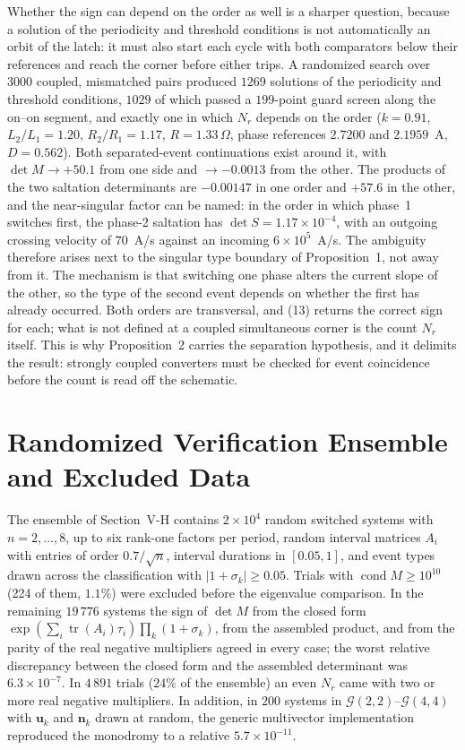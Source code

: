 \documentclass[journal]{IEEEtran}
\begin{document}
Whether the sign can depend on the order as well is a sharper question,
because a solution of the periodicity and threshold conditions is not
automatically an orbit of the latch: it must also start each cycle with both
comparators below their references and reach the corner before either
trips. A randomized search over $3000$ coupled, mismatched pairs produced
$1269$ solutions of the periodicity and threshold conditions, $1029$ of
which passed a $199$-point guard screen along the on--on segment, and
exactly one in which $N_r$ depends on the order ($k=0.91$, $L_2/L_1=1.20$,
$R_2/R_1=1.17$, $R=1.33\,\Omega$, phase references $2.7200$ and $2.1959$~A,
$D=0.562$). Both separated-event continuations exist around it, with
$\det M\to+50.1$ from one side and $\to-0.0013$ from the other. The products
of the two saltation determinants are $-0.00147$ in one order and $+57.6$
in the other, and the near-singular factor can be named: in the order in
which phase~1 switches first, the phase-2 saltation has
$\det S=1.17\times10^{-4}$, with an outgoing crossing velocity of $70$~A/s
against an incoming $6\times10^{5}$~A/s. The ambiguity therefore arises next
to the singular type boundary of Proposition~1, not away
from it. The mechanism is that switching one phase alters the current slope
of the other, so the type of the second event depends on whether the
first has already occurred. Both orders are transversal, and
(13) returns the correct sign for each; what is not defined at
a coupled simultaneous corner is the count $N_r$ itself. This is why
Proposition~2 carries the separation hypothesis, and it
delimits the result: strongly coupled converters must be checked for event
coincidence before the count is read off the schematic.

\section{Randomized Verification Ensemble and Excluded Data}
The ensemble of Section~V-H contains $2\times10^{4}$ random
switched systems with $n=2,\dots,8$, up to six rank-one factors per period,
random interval matrices $A_i$ with entries of order $0.7/\sqrt{n}$, interval
durations in $[0.05,1]$, and event types drawn across the classification with
$\lvert1+\sigma_k\rvert\ge0.05$. Trials with $\operatorname{cond}M\ge10^{10}$
(224 of them, $1.1\%$) were excluded before the eigenvalue comparison. In the
remaining $19\,776$ systems the sign of $\det M$ from the closed form
$\exp(\sum_i\operatorname{tr}(A_i)\tau_i)\prod_k(1+\sigma_k)$, from the
assembled product, and from the parity of the real negative multipliers
agreed in every case; the worst relative discrepancy between the closed form
and the assembled determinant was $6.3\times10^{-7}$. In $4\,891$ trials
($24\%$ of the ensemble) an even $N_r$ came with two or more real negative
multipliers. In addition, in $200$ systems in
$\mathcal{G}(2,2)$--$\mathcal{G}(4,4)$ with $\bm{u}_k$ and $\bm{n}_k$ drawn at
random, the generic multivector implementation reproduced the monodromy to a
relative $5.7\times10^{-11}$.
\end{document}
